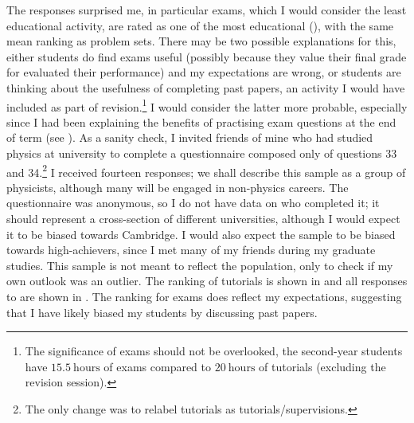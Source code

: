 The responses surprised me, in particular exams, which I would consider the least educational activity, are rated as one of the most educational (), with the same mean ranking as problem sets. There may be two possible explanations for this, either students do find exams useful (possibly because they value their final grade for evaluated their performance) and my expectations are wrong, or students are thinking about the usefulness of completing past papers, an activity I would have included as part of revision.\footnote{The significance of exams should not be overlooked, the second-year students have $15.5~\mathrm{hours}$ of exams compared to $20~\mathrm{hours}$ of tutorials (excluding the revision session).} I would consider the latter more probable, especially since I had been explaining the benefits of practising exam questions at the end of term (see ). As a sanity check, I invited friends of mine who had studied physics at university to complete a questionnaire composed only of questions 33 and 34.\footnote{The only change was to relabel tutorials as tutorials/supervisions.} I received fourteen responses; we shall describe this sample as a group of physicists, although many will be engaged in non-physics careers. The questionnaire was anonymous, so I do not have data on who completed it; it should represent a cross-section of different universities, although I would expect it to be biased towards Cambridge. I would also expect the sample to be biased towards high-achievers, since I met many of my friends during my graduate studies. This sample is not meant to reflect the population, only to check if my own outlook was an outlier. The ranking of tutorials is shown in  and all responses to are shown in . The ranking for exams does reflect my expectations, suggesting that I have likely biased my students by discussing past papers.
